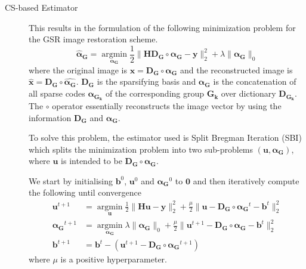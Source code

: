 \documentclass[a4paper]{article}
\begin{document}
\begin{description}
	\item[CS-based Estimator] 
	This results in the formulation of the following minimization problem for the GSR image restoration scheme.
	\begin{equation}
	\bm{\hat{\alpha}_G} = \operatorname*{argmin}_{\bm{\alpha_G}} \frac{1}{2}\|\bm{HD_G}\circ\bm{\alpha_G}-\bm{y}\|_2^2 + \lambda\|\bm{\alpha_G}\|_0
	\end{equation}
	where the original image is $\bm{x}=\bm{D_G}\circ\bm{\alpha_G}$ and the reconstructed image is $\hat{\bm{x}}=\bm{D_G}\circ\bm{\hat{\alpha_G}}$. $\bm{D_G}$ is the sparsifying basis and $\bm{\alpha_G}$ is the concatenation of all sparse codes $\bm{\alpha_{G_k}}$ of the corresponding group $\bm{G_k}$ over dictionary $\bm{D_{G_k}}$. The $\circ$ operator essentially reconstructs the image vector by using the information $\bm{D_G}$ and $\bm{\alpha_G}$.

	To solve this problem, the estimator used is Split Bregman Iteration (SBI) which splits the minimization problem into two sub-problems $(\bm{u}, \bm{\alpha_G})$, where $\bm{u}$ is intended to be $\bm{D_G}\circ\bm{\alpha_G}$.

	We start by initialising $\bm{b}^0$, $\bm{u}^0$ and $\bm{\alpha_G}^0$ to $\bm{0}$ and then iteratively compute the following until convergence
	\begin{align}
	\bm{u}^{t+1} &= \operatorname*{argmin}_{\bm{u}} \frac{1}{2}\|\bm{Hu}-\bm{y}\|_2^2 +\frac{\mu}{2}\|\bm{u}-\bm{D_G}\circ\bm{\alpha_G}^{t} - \bm{b}^{t}\|_2^2\\
	\bm{\alpha_G}^{t+1} &= \operatorname*{argmin}_{\bm{\alpha_{G}}} \lambda\|\bm{\alpha_G}\|_0 +\frac{\mu}{2}\|\bm{u}^{t+1}-\bm{D_G}\circ\bm{\alpha_G} - \bm{b}^{t}\|_2^2\\
	\bm{b}^{t+1} &=  \bm{b}^{t} - (\bm{u}^{t+1}-\bm{D_G}\circ\bm{\alpha_G}^{t+1})
	\end{align}
	where $\mu$ is a positive hyperparameter.
\end{description}
\end{document}
